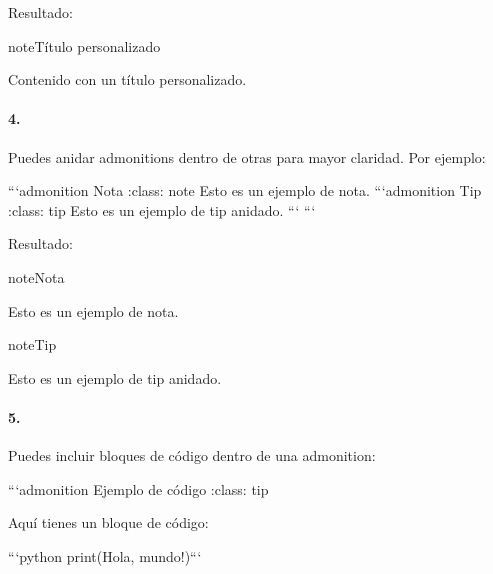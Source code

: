 \documentclass[a4paper,10pt,oneside,spanish,openany]{sphinxmanual}
\begin{document}
\sphinxAtStartPar
Resultado:

\begin{sphinxadmonition}{note}{Título personalizado}

\sphinxAtStartPar
Contenido con un título personalizado.
\end{sphinxadmonition}


\paragraph{4. }
\label{\detokenize{configuracion_inicial/013.guia_de_myst_parser:admonitions-anidadas}}
\sphinxAtStartPar
Puedes anidar admonitions dentro de otras para mayor claridad. Por ejemplo:

\begin{sphinxVerbatim}[commandchars=\\\{\}]
    ```\PYGZob{}admonition\PYGZcb{} Nota :class: note Esto es un ejemplo de nota. 
      ```\PYGZob{}admonition\PYGZcb{} Tip :class: tip Esto es un ejemplo de tip anidado. ```
    ```
\end{sphinxVerbatim}

\sphinxAtStartPar
Resultado:

\begin{sphinxadmonition}{note}{Nota}

\sphinxAtStartPar
Esto es un ejemplo de nota.

\begin{sphinxadmonition}{note}{Tip}

\sphinxAtStartPar
Esto es un ejemplo de tip anidado. \textasciigrave{}\textasciigrave{}\textasciigrave{}
\end{sphinxadmonition}
\end{sphinxadmonition}


\paragraph{5. }
\label{\detokenize{configuracion_inicial/013.guia_de_myst_parser:admonitions-con-bloques-de-codigo}}
\sphinxAtStartPar
Puedes incluir bloques de código dentro de una admonition:

\begin{sphinxVerbatim}[commandchars=\\\{\}]
```\PYGZob{}admonition\PYGZcb{} Ejemplo de código
:class: tip

Aquí tienes un bloque de código:

```python
print(\PYGZdq{}Hola, mundo!\PYGZdq{})``` 
\end{sphinxVerbatim}
\end{document}
